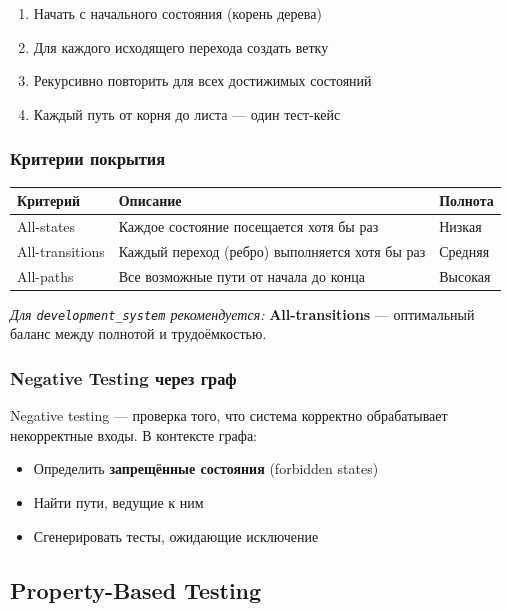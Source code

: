 \documentclass[12pt, a4paper, twoside]{article}
\begin{document}
\begin{enumerate}[leftmargin=1.5em]
  \item Начать с начального состояния (корень дерева)
  \item Для каждого исходящего перехода создать ветку
  \item Рекурсивно повторить для всех достижимых состояний
  \item Каждый путь от корня до листа --- один тест-кейс
\end{enumerate}

\subsubsection{Критерии покрытия}

\begin{center}
\begin{tabularx}{\textwidth}{lLl}
  \toprule
  \textbf{Критерий} & \textbf{Описание} & \textbf{Полнота} \\
  \midrule
  All-states     & Каждое состояние посещается хотя бы раз & Низкая \\
  All-transitions & Каждый переход (ребро) выполняется хотя бы раз & Средняя \\
  All-paths      & Все возможные пути от начала до конца & Высокая \\
  \bottomrule
\end{tabularx}
\end{center}

\textit{Для \texttt{development\_system} рекомендуется:} \textbf{All-transitions} ---
оптимальный баланс между полнотой и трудоёмкостью.

\subsubsection{Negative Testing через граф}

Negative testing --- проверка того, что система корректно обрабатывает
некорректные входы. В контексте графа:

\begin{itemize}[leftmargin=1.5em]
  \item Определить \textbf{запрещённые состояния} (forbidden states)
  \item Найти пути, ведущие к ним
  \item Сгенерировать тесты, ожидающие исключение
\end{itemize}

\subsection{Property-Based Testing}
\end{document}
